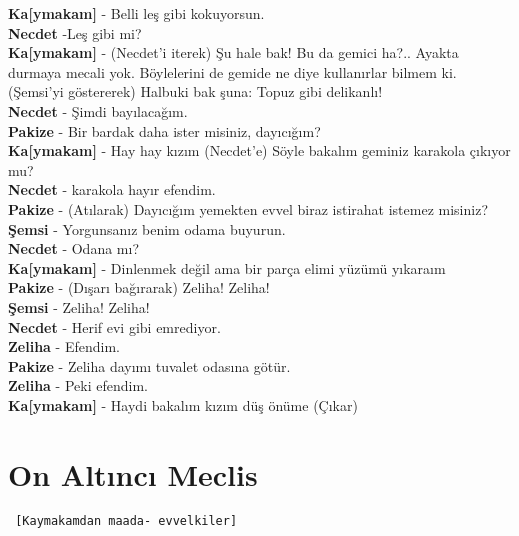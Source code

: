 \documentclass[]{book}
\begin{document}
\textbf{Ka{[}ymakam{]}} - Belli leş gibi kokuyorsun.\\
\textbf{Necdet} -Leş gibi mi?\\
\textbf{Ka{[}ymakam{]}} - (Necdet'i iterek) Şu hale bak! Bu da gemici ha?.. Ayakta durmaya mecali yok. Böylelerini de gemide ne diye kullanırlar bilmem ki. (Şemsi'yi göstererek) Halbuki bak şuna: Topuz gibi delikanlı!\\
\textbf{Necdet} - Şimdi bayılacağım.\\
\textbf{Pakize} - Bir bardak daha ister misiniz, dayıcığım?\\
\textbf{Ka{[}ymakam{]}} - Hay hay kızım (Necdet'e) Söyle bakalım geminiz karakola çıkıyor mu?\\
\textbf{Necdet} - karakola hayır efendim.\\
\textbf{Pakize} - (Atılarak) Dayıcığım yemekten evvel biraz istirahat istemez misiniz?\\
\textbf{Şemsi} - Yorgunsanız benim odama buyurun.\\
\textbf{Necdet} - Odana mı?\\
\textbf{Ka{[}ymakam{]}} - Dinlenmek değil ama bir parça elimi yüzümü yıkaraım\\
\textbf{Pakize} - (Dışarı bağırarak) Zeliha! Zeliha!\\
\textbf{Şemsi} - Zeliha! Zeliha!\\
\textbf{Necdet} - Herif evi gibi emrediyor.\\
\textbf{Zeliha} - Efendim.\\
\textbf{Pakize} - Zeliha dayımı tuvalet odasına götür.\\
\textbf{Zeliha} - Peki efendim.\\
\textbf{Ka{[}ymakam{]}} - Haydi bakalım kızım düş önüme (Çıkar)\\

\hypertarget{on-altinci-meclis}{%
\section{On Altıncı Meclis}\label{on-altinci-meclis}}

\begin{verbatim}
 [Kaymakamdan maada- evvelkiler]
 
\end{verbatim}
\end{document}
